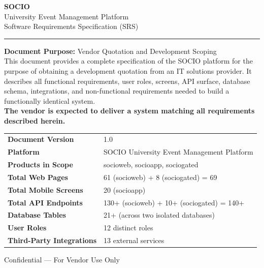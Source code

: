 \documentclass[12pt,a4paper]{article}
\begin{document}
\begin{titlepage}
    \centering
    \vspace*{1.5cm}

    {\fontsize{38}{46}\selectfont\bfseries\color{primary} SOCIO}\\[0.4cm]
    {\Large\color{accent} University Event Management Platform}\\[0.3cm]
    {\large\color{darkgray} Software Requirements Specification (SRS)}

    \vspace{1cm}
    \noindent\rule{\textwidth}{1.5pt}
    \vspace{0.5cm}

    \begin{infobox}
        \centering
        \textbf{Document Purpose:} Vendor Quotation and Development Scoping\\[0.3cm]
        This document provides a complete specification of the SOCIO platform for the purpose of obtaining a development quotation from an IT solutions provider. It describes all functional requirements, user roles, screens, API surface, database schema, integrations, and non-functional requirements needed to build a functionally identical system.\\[0.3cm]
        \textbf{The vendor is expected to deliver a system matching all requirements described herein.}
    \end{infobox}

    \vspace{1cm}

    \begin{tabularx}{\textwidth}{L{4cm} X}
    \toprule
    \textbf{Document Version} & 1.0 \\
    \textbf{Platform} & SOCIO University Event Management Platform \\
    \textbf{Products in Scope} & socioweb, socioapp, sociogated \\
    \textbf{Total Web Pages} & 61 (socioweb) + 8 (sociogated) = 69 \\
    \textbf{Total Mobile Screens} & 20 (socioapp) \\
    \textbf{Total API Endpoints} & 130+ (socioweb) + 10+ (sociogated) = 140+ \\
    \textbf{Database Tables} & 21+ (across two isolated databases) \\
    \textbf{User Roles} & 12 distinct roles \\
    \textbf{Third-Party Integrations} & 13 external services \\
    \bottomrule
    \end{tabularx}

    \vfill
    {\small\color{darkgray} Confidential — For Vendor Use Only \textbullet\ \the\year}
\end{titlepage}
\end{document}
